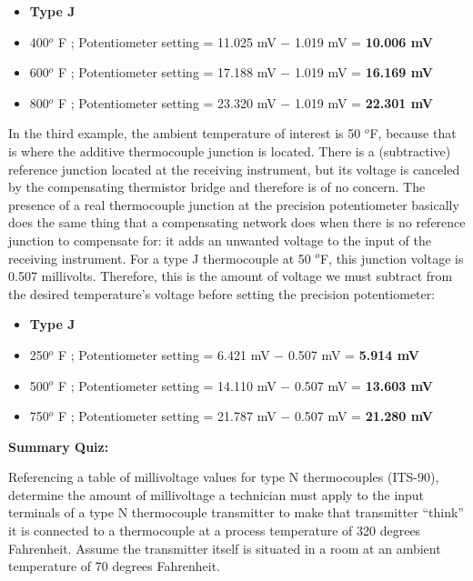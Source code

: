 \begin{itemize}
\item{} {\bf Type J}
\item{} 400$^{o}$ F ; Potentiometer setting = 11.025 mV $-$ 1.019 mV = {\bf 10.006 mV}
\item{} 600$^{o}$ F ; Potentiometer setting = 17.188 mV $-$ 1.019 mV = {\bf 16.169 mV} 
\item{} 800$^{o}$ F ; Potentiometer setting = 23.320 mV $-$ 1.019 mV = {\bf 22.301 mV} 
\end{itemize}

\vskip 10pt

In the third example, the ambient temperature of interest is 50 $^{o}$F, because that is where the additive thermocouple junction is located.  There is a (subtractive) reference junction located at the receiving instrument, but its voltage is canceled by the compensating thermistor bridge and therefore is of no concern.  The presence of a real thermocouple junction at the precision potentiometer basically does the same thing that a compensating network does when there is no reference junction to compensate for: it adds an unwanted voltage to the input of the receiving instrument.  For a type J thermocouple at 50 $^{o}$F, this junction voltage is 0.507 millivolts.  Therefore, this is the amount of voltage we must subtract from the desired temperature's voltage before setting the precision potentiometer:

\begin{itemize}
\item{} {\bf Type J}
\item{} 250$^{o}$ F ; Potentiometer setting = 6.421 mV $-$ 0.507 mV = {\bf 5.914 mV} 
\item{} 500$^{o}$ F ; Potentiometer setting = 14.110 mV $-$ 0.507 mV = {\bf 13.603 mV} 
\item{} 750$^{o}$ F ; Potentiometer setting = 21.787 mV $-$ 0.507 mV = {\bf 21.280 mV}
\end{itemize}
















\vfil \eject

\noindent
{\bf Summary Quiz:}

Referencing a table of millivoltage values for type N thermocouples (ITS-90), determine the amount of millivoltage a technician must apply to the input terminals of a type N thermocouple transmitter to make that transmitter ``think'' it is connected to a thermocouple at a process temperature of 320 degrees Fahrenheit.  Assume the transmitter itself is situated in a room at an ambient temperature of 70 degrees Fahrenheit.




